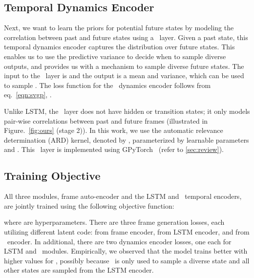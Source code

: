 \documentclass{article} \usepackage{iclr2021_conference,times}
\newcommand{\GP}{}
\begin{document}
\subsection{ Temporal Dynamics Encoder} 
\vspace{-0.05in}
Next, we want to learn the priors for potential future states by modeling the correlation between past and future states using a \GP\ layer. Given a past state, this temporal dynamics encoder captures the distribution over future states. This enables us to use the predictive variance to decide when to sample diverse outputs, and  provides us with a mechanism to sample diverse future states. The input to the \GP\ layer is  and the output is a mean and variance, which can be used to sample . The loss function for the \GP\ dynamics encoder follows from eq.~\ref{eqn:svgp}, . 


Unlike LSTM, the \GP\ layer does not have hidden or transition states; it only models pair-wise correlations between past and future frames (illustrated in Figure.~\ref{fig:ours} (stage 2)). In this work, we use the automatic relevance determination (ARD) kernel, denoted by
,
parameterized by learnable parameters  and . This \GP\ layer is implemented using GPyTorch~\citep{gardner2018gpytorch} (refer to \ref{sec:review}).


\vspace{-0.05in}
\subsection{Training Objective}
\vspace{-0.05in}
All three modules, frame auto-encoder and the LSTM and \GP\ temporal encoders, are jointly trained using the following objective function: 

where  are hyperparameters. There are three frame generation losses, each utilizing different latent code:  from frame encoder,  from LSTM encoder, and  from \GP\ encoder. In additional, there are two dynamics encoder losses, one each for LSTM and \GP\ modules.  
Empirically, we observed that the model trains better with higher values for , possibly because \GP\ is only used to sample a diverse state and all other states are sampled from the LSTM encoder.


\vspace{-0.05in}
\end{document}
